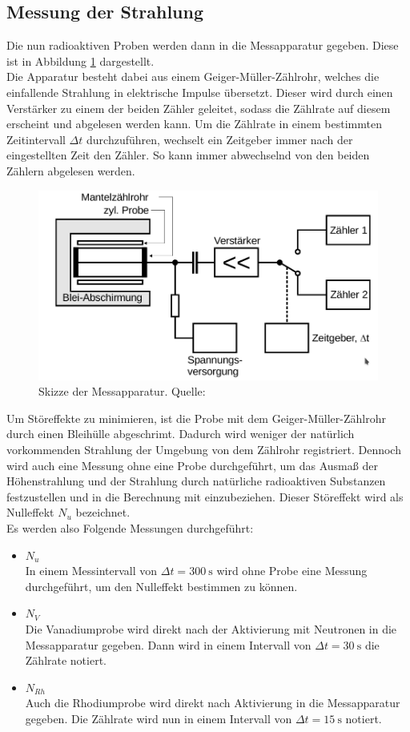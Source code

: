 \subsection{Messung der Strahlung}
\label{sec:Messung}
Die nun radioaktiven Proben werden dann in die Messapparatur gegeben. Diese ist in Abbildung 
\ref{fig:Apparatur} dargestellt.\\
Die Apparatur besteht dabei aus einem Geiger-Müller-Zählrohr, welches die einfallende Strahlung in 
elektrische Impulse übersetzt. Dieser wird durch einen Verstärker zu einem der beiden Zähler geleitet, 
sodass die Zählrate auf diesem erscheint und abgelesen werden kann. Um die Zählrate in einem bestimmten
Zeitintervall $\Delta t$ durchzuführen, wechselt ein Zeitgeber immer nach der eingestellten Zeit den 
Zähler. So kann immer abwechselnd von den beiden Zählern abgelesen werden.
\begin{figure}[H]
    \centering
    \includegraphics[scale=0.4]{content/Messapparatur.png}
    \caption{Skizze der Messapparatur. Quelle:\cite{AP01}}
    \label{fig:Apparatur}
  \end{figure}
\noindent Um Störeffekte zu minimieren, ist die Probe mit dem Geiger-Müller-Zählrohr durch einen Bleihülle 
abgeschrimt. Dadurch wird weniger der natürlich vorkommenden Strahlung der Umgebung von dem Zählrohr 
registriert. Dennoch wird auch eine Messung ohne eine Probe durchgeführt, um das Ausmaß der 
Höhenstrahlung und der Strahlung durch natürliche radioaktiven Substanzen festzustellen und in die 
Berechnung mit einzubeziehen. Dieser Störeffekt wird als Nulleffekt $N_u$ bezeichnet.
\\
Es werden also Folgende Messungen durchgeführt:
\begin{itemize}
    \item $N_u$\\
    In einem Messintervall von $\Delta t=\SI{300}{\second}$ wird ohne Probe eine Messung durchgeführt, 
    um den Nulleffekt bestimmen zu können.
    \item $N_{V}$\\
    Die Vanadiumprobe wird direkt nach der Aktivierung mit Neutronen in die Messapparatur gegeben. Dann 
    wird in einem Intervall von $\Delta t=\SI{30}{\second}$ die Zählrate notiert. 
    \item $N_{Rh}$\\
    Auch die Rhodiumprobe wird direkt nach Aktivierung in die Messapparatur gegeben. Die Zählrate wird 
    nun in einem Intervall von $\Delta t=\SI{15}{\second}$ notiert.
\end{itemize}